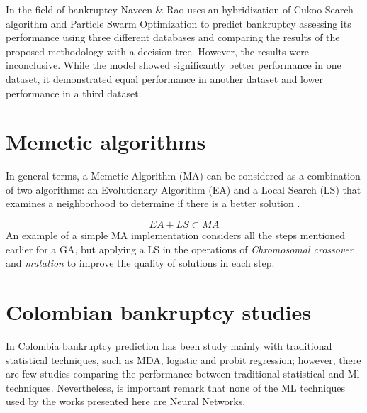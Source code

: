 \documentclass[journal]{IEEEtai}
\begin{document}
In the field of bankruptcy  Naveen \& Rao \cite{memetic} uses an hybridization of  Cukoo Search algorithm and Particle Swarm Optimization to predict bankruptcy assessing its performance using three different databases and comparing the results of  the proposed methodology with a decision tree. However, the results were inconclusive. While the model showed significantly better performance in one dataset, it demonstrated equal performance in another dataset and lower performance in a third dataset.



\section{Memetic algorithms}

In general terms, a Memetic Algorithm (MA) can be considered as a combination of two algorithms: an Evolutionary Algorithm (EA) and a Local Search (LS) that examines a neighborhood to determine if there is a better solution \cite{memes1}.

\begin{equation}
    EA + LS \subset MA
\end{equation}
An example of a simple MA implementation considers all the steps mentioned earlier for a GA, but applying a LS in the operations of \textit{Chromosomal crossover} and \textit{mutation} to improve the quality of solutions in each step.


\section{Colombian bankruptcy studies}

In Colombia bankruptcy prediction has been study mainly with  traditional statistical techniques, such as MDA, logistic and probit regression; however, there are few studies comparing  the performance between traditional statistical and Ml techniques. Nevertheless, is important remark that none of the ML techniques used by the works presented here  are Neural Networks.
\end{document}
